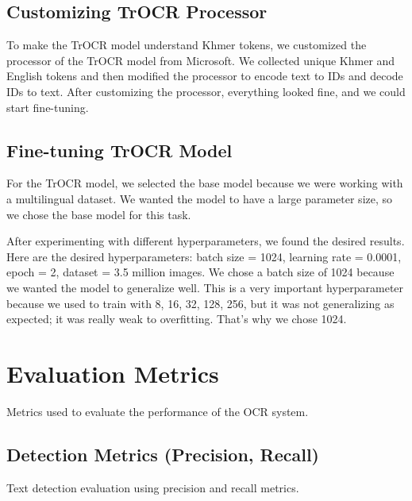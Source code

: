\subsection{Customizing TrOCR Processor}
\label{subsec:customizing-trocr-processor}
To make the TrOCR model understand Khmer tokens, we customized the processor of the TrOCR 
model from Microsoft. We collected unique Khmer and English tokens and then modified the 
processor to encode text to IDs and decode IDs to text. After customizing the processor, 
everything looked fine, and we could start fine-tuning.

\subsection{Fine-tuning TrOCR Model}
\label{subsec:fine-tuning-trocr-model}
For the TrOCR model, we selected the base model because we were working with a multilingual 
dataset. We wanted the model to have a large parameter size, so we chose the base model for 
this task.

After experimenting with different hyperparameters, we found the desired results. Here are the 
desired hyperparameters: batch size = 1024, learning rate = 0.0001, epoch = 2, dataset = 3.5 
million images. We chose a batch size of 1024 because we wanted the model to generalize well. 
This is a very important hyperparameter because we used to train with 8, 16, 32, 128, 256, 
but it was not generalizing as expected; it was really weak to overfitting. That's why we 
chose 1024.

\section{Evaluation Metrics}
\label{sec:metrics}
Metrics used to evaluate the performance of the OCR system.

\subsection{Detection Metrics (Precision, Recall)}
\label{subsec:detection-metrics}
Text detection evaluation using precision and recall metrics.

